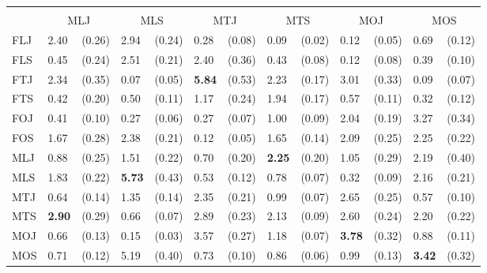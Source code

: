 \begin{tabular}{ll@{\,\,\,}rl@{\,\,\,}rl@{\,\,\,}rl@{\,\,\,}rl@{\,\,\,}rl@{\,\,\,}r}
\phantom{\textbf{Receiver}} &\\
    & \multicolumn{2}{c}{\textnormal{MLJ}}
    & \multicolumn{2}{c}{\textnormal{MLS}}
    & \multicolumn{2}{c}{\textnormal{MTJ}}
    & \multicolumn{2}{c}{\textnormal{MTS}}
    & \multicolumn{2}{c}{\textnormal{MOJ}}
    & \multicolumn{2}{c}{\textnormal{MOS}} \\
    \cmidrule(lr){2-3}
    \cmidrule(lr){4-5}
    \cmidrule(lr){6-7}
    \cmidrule(lr){8-9}
    \cmidrule(lr){10-11}
    \cmidrule(lr){12-13}
    \textnormal{FLJ} & 2.40 & (0.26) & 2.94 & (0.24) & 0.28 & (0.08) & 0.09 & (0.02) & 0.12 & (0.05) & 0.69 & (0.12) \\
    \textnormal{FLS} & 0.45 & (0.24) & 2.51 & (0.21) & 2.40 & (0.36) & 0.43 & (0.08) & 0.12 & (0.08) & 0.39 & (0.10) \\
    \textnormal{FTJ} & 2.34 & (0.35) & 0.07 & (0.05) & \textbf{5.84} & (0.53) & 2.23 & (0.17) & 3.01 & (0.33) & 0.09 & (0.07) \\
    \textnormal{FTS} & 0.42 & (0.20) & 0.50 & (0.11) & 1.17 & (0.24) & 1.94 & (0.17) & 0.57 & (0.11) & 0.32 & (0.12) \\
    \textnormal{FOJ} & 0.41 & (0.10) & 0.27 & (0.06) & 0.27 & (0.07) & 1.00 & (0.09) & 2.04 & (0.19) & 3.27 & (0.34) \\
    \textnormal{FOS} & 1.67 & (0.28) & 2.38 & (0.21) & 0.12 & (0.05) & 1.65 & (0.14) & 2.09 & (0.25) & 2.25 & (0.22) \\
    \textnormal{MLJ} & 0.88 & (0.25) & 1.51 & (0.22) & 0.70 & (0.20) & \textbf{2.25} & (0.20) & 1.05 & (0.29) & 2.19 & (0.40) \\
    \textnormal{MLS} & 1.83 & (0.22) & \textbf{5.73} & (0.43) & 0.53 & (0.12) & 0.78 & (0.07) & 0.32 & (0.09) & 2.16 & (0.21) \\
    \textnormal{MTJ} & 0.64 & (0.14) & 1.35 & (0.14) & 2.35 & (0.21) & 0.99 & (0.07) & 2.65 & (0.25) & 0.57 & (0.10) \\
    \textnormal{MTS} & \textbf{2.90} & (0.29) & 0.66 & (0.07) & 2.89 & (0.23) & 2.13 & (0.09) & 2.60 & (0.24) & 2.20 & (0.22) \\
    \textnormal{MOJ} & 0.66 & (0.13) & 0.15 & (0.03) & 3.57 & (0.27) & 1.18 & (0.07) & \textbf{3.78} & (0.32) & 0.88 & (0.11) \\
    \textnormal{MOS} & 0.71 & (0.12) & 5.19 & (0.40) & 0.73 & (0.10) & 0.86 & (0.06) & 0.99 & (0.13) & \textbf{3.42} & (0.32) \\
\bottomrule
\end{tabular}